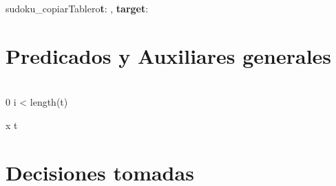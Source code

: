 \documentclass[a4paper]{article}
\begin{document}
\begin{proc}{sudoku\_copiarTablero}{\textbf{\In t}: \matriz{\ent}, \textbf{\Out target}: \matriz{\ent}}{}{}
		\pre{\True}
    \post{}
\end{proc}



\section{Predicados y Auxiliares generales}

	
				
		
{\\
	0 \leq  i < length(t)\\
}
		
{
	{x}
	{t}
}
		
		
        
		
\section{Decisiones tomadas}
\end{document}
